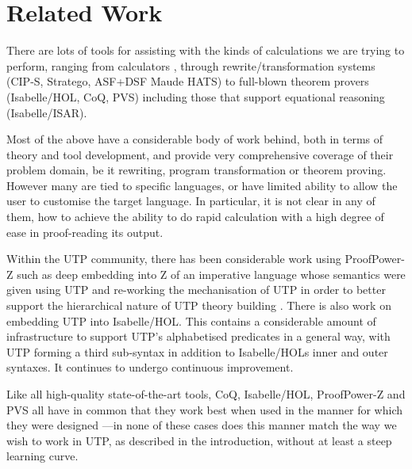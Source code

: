 \section{Related Work}\label{sec:Related}

There are lots of tools for assisting with the kinds of
calculations we are trying to perform,
ranging from calculators
\cite{Bird14},
through rewrite/transformation
systems
(CIP-S\cite{DBLP:books/sp/BauerEH87},
Stratego\cite{conf/rta/Visser01},
ASF+DSF\cite{VanDenBrand:2002:CLD}
Maude\cite{conf/rta/ClavelDELMMT03}
HATS\cite{conf/gttse/WinterB06})
to full-blown theorem provers
(Isabelle/HOL\cite{books/sp/NipkowPW02},
CoQ\cite{bk:Coq'Art:04},
PVS\cite{conf/fmcad/Shankar96})
including those that support equational reasoning
(Isabelle/ISAR\cite{man:Isabelle:Isar:Wenzel:10}).

Most of the above have a considerable body of work behind,
both in terms of theory and tool development,
and provide very comprehensive coverage of their problem domain,
be it rewriting, program transformation or theorem proving.
However many are tied to specific languages,
or have limited ability to allow the user to customise the target language.
In particular,
it is not clear in any of them,
how to achieve the ability to do rapid calculation
with a high degree of ease in proof-reading its
output.

Within the UTP community,
there has been considerable work using Proof{\-}Power-Z
such as deep embedding into Z of an imperative language whose semantics
were given using UTP \cite{conf/utp/NukaW06}and
 re-working the mechanisation of UTP in order to better support
the hierarchical nature of UTP theory building \cite{journals/entcs/ZeydaC09}.
%
There is also work on embedding UTP into Isabelle/HOL\cite{DBLP:conf/utp/FosterZW14}.
This contains a considerable amount of infrastructure to support UTP's
alphabetised predicates in a general way, with UTP forming a third
sub-syntax in addition to Isabelle/HOLs inner and outer syntaxes.
It continues to undergo continuous improvement\cite{DBLP:series/natosec/FosterW15}.

Like all high-quality state-of-the-art tools, CoQ, Isabelle/HOL, ProofPower-Z and PVS
all have in common that they work best when used in the manner
for which they were designed%
---in none of these cases does this manner match the way
we wish to work in UTP, as described in the introduction,
without at least a steep learning curve.


